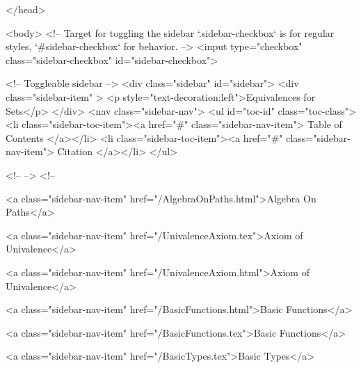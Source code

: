   
</head>




  <body>
    <!-- Target for toggling the sidebar `.sidebar-checkbox` is for regular
     styles, `#sidebar-checkbox` for behavior. -->
<input type="checkbox" class="sidebar-checkbox" id="sidebar-checkbox">

<!-- Toggleable sidebar -->
<div class="sidebar" id="sidebar">
  <div class="sidebar-item" >
    <p style="text-decoration:left">Equivalences for Sets</p>
  </div>
  <nav class="sidebar-nav">
    <ul id="toc-id" class="toc-class">
  <li class="sidebar-toc-item"><a href="#" class="sidebar-nav-item"> Table of Contents </a></li>
  <li class="sidebar-toc-item"><a href="#" class="sidebar-nav-item"> Citation </a></li>
</ul>


    <!--  -->
    <!-- 
      
    
      
    
      
    
      
        
      
    
      
        
          <a class="sidebar-nav-item" href="/AlgebraOnPaths.html">Algebra On Paths</a>
        
      
    
      
        
          <a class="sidebar-nav-item" href="/UnivalenceAxiom.tex">Axiom of Univalence</a>
        
      
    
      
        
          <a class="sidebar-nav-item" href="/UnivalenceAxiom.html">Axiom of Univalence</a>
        
      
    
      
        
          <a class="sidebar-nav-item" href="/BasicFunctions.html">Basic Functions</a>
        
      
    
      
        
          <a class="sidebar-nav-item" href="/BasicFunctions.tex">Basic Functions</a>
        
      
    
      
        
          <a class="sidebar-nav-item" href="/BasicTypes.tex">Basic Types</a>
        
      
    
      
        
